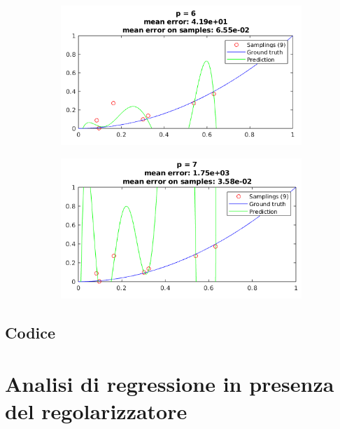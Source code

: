 \documentclass[12pt]{article}
\begin{document}
\begin{figure}[H]
  \centering
  \begin{subfigure}{0.45\textwidth}
    \includegraphics[width=\textwidth]{plots/regression/p_eq_6.png}
  \end{subfigure}
  \begin{subfigure}{0.45\textwidth}
    \includegraphics[width=\textwidth]{plots/regression/p_eq_7.png}
  \end{subfigure}
\end{figure}

\newpage
\subsection{Codice}


\newpage
\section{Analisi di regressione in presenza del regolarizzatore}
\end{document}
